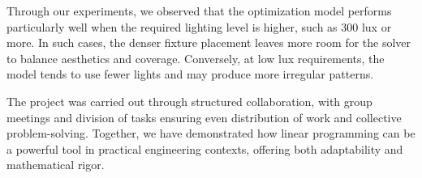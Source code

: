 \documentclass{article}
\begin{document}
Through our experiments, we observed that the optimization model performs particularly well when the required lighting level is higher,
such as 300 lux or more. In such cases, the denser fixture placement leaves more room for the solver to balance aesthetics and coverage.
Conversely, at low lux requirements, the model tends to use fewer lights and may produce more irregular patterns.

The project was carried out through structured collaboration, with group meetings and division of tasks ensuring even distribution of work 
and collective problem-solving. Together, we have demonstrated how linear programming can be a powerful tool
in practical engineering contexts, offering both adaptability and mathematical rigor.
\end{document}
